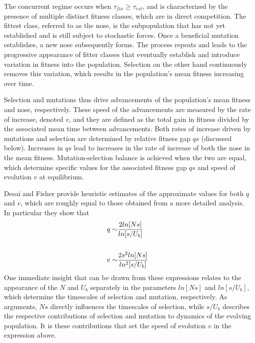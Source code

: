 \documentclass[12pt]{article}
\begin{document}
The concurrent regime occurs when $\tau_{fix} \ge \tau_{est}$, and is characterized by the presence of multiple distinct fitness classes, which are in direct competition.  The fittest class, referred to as the nose, is the subpopulation that has not yet established and is still subject to stochastic forces.  Once a beneficial mutation establishes, a new nose subsequently forms.  The process repeats and leads to the progressive appearance of fitter classes that eventually establish and introduce variation in fitness into the population.  Selection on the other hand continuously removes this variation, which results in the population's mean fitness  increasing over time.  

Selection and mutations thus drive advancements of the population's mean fitness and nose, respectively.  These speed of the advancements are measured by the rate of increase, denoted $v$, and they are defined as the total gain in fitness divided by the associated mean time between advancements.  Both rates of increase driven by mutations and selection are determined by relative fitness gap $qs$ (discussed below).  Increases in $qs$ lead to increases in the rate of increase of both the nose in the mean fitness.  Mutation-selection balance is achieved when the two are equal, which determine specific values for the associated fitness gap $qs$ and speed of evolution $v$ at equilibrium. 

Desai and Fisher provide heuristic estimates of the approximate values for both $q$ and $v$, which are roughly equal to those obtained from a more detailed analysis.  In particular they show that
\begin{equation}
\begin{aligned}
q \sim & {2ln[Ns] \over ln[s/U_b]} \\   
\\
v \sim & {2s^2ln[Ns] \over ln^2[s/U_b]}
\end{aligned}
\end{equation}
One immediate insight that can be drawn from these expressions relates to the appearance of the $N$ and $U_b$ separately in the parameters $ln[Ns]$ and $ln[s/U_b]$, which determine the timescales of selection and mutation, respectively.  As arguments, $Ns$ directly influences the timescales of selection, while $s/U_b$ describes the respective contributions of selection and mutation to dynamics of the evolving population.  It is these contributions that set the speed of evolution $v$ in the expression above.   
\end{document}
